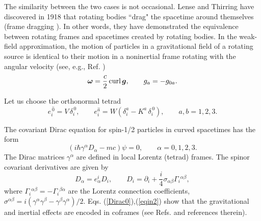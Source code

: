 \documentclass[preprint,showpacs,preprintnumbers,amsmath,amssymb]{revtex4}
\begin{document}
The similarity between the two cases is not occasional. Lense and Thirring
have discovered in 1918 that rotating bodies ``drag" the spacetime around
themselves (frame dragging \cite{LT}). In other words, they have demonstrated
the equivalence between rotating frames and spacetimes created by rotating
bodies. In the weak-field approximation, the motion of particles in a
gravitational field of a rotating source is identical to their motion
in a noninertial frame rotating with the angular
velocity (see, e.g., Ref. \cite{LL}) %
\begin{equation}
\bm\omega = \frac {c}{2}\,{\rm curl}\,\bm g,\qquad g_a=-g_{0a}.\label{equiv}
\end{equation}

Let us choose the orthonormal tetrad
\begin{equation}
e_i^{\,\widehat{0}} = V\,\delta^{\,0}_i,\qquad
e_i^{\widehat{a}} =
W\left( \delta^a_i - K^a\,\delta^{\,0}_i\right),\qquad a,b =1,2,3.
\label{coframe}
\end{equation}

The covariant Dirac equation for spin-1/2 particles in curved
spacetimes has the form
\begin{equation}
(i\hbar\gamma^\alpha D_\alpha - mc)\psi=0,\qquad \alpha=0,1,2,3.
\label{Dirac0}
\end{equation}
The Dirac matrices $\gamma^\alpha$ are defined in
local Lorentz (tetrad) frames. The spinor
covariant derivatives are given by
\begin{equation}
D_\alpha = e_\alpha^i D_i,\qquad D_i = \partial _i + {\frac
i4}\sigma_{\alpha\beta}\Gamma_i{}^{\alpha\beta},\label{eqin2}
\end{equation}
where $\Gamma_i{}^{\alpha\beta} = - \Gamma_i{}^{\beta\alpha}$ are the
Lorentz connection coefficients,
$\sigma^{\alpha\beta} = i(\gamma^\alpha\gamma^\beta -\gamma^\beta
\gamma^\alpha)/2$. Eqs. (\ref{Dirac0}),(\ref{eqin2}) show that the
gravitational and inertial effects are encoded in coframes
(see Refs. \cite{Ob1,Ob2} and references therein).
\end{document}
